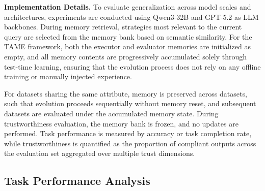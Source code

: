 \documentclass{article}
\theoremstyle{plain}
\theoremstyle{definition}
\theoremstyle{remark}
\begin{document}
\textbf{Implementation Details.}
To evaluate generalization across model scales and architectures, experiments are conducted using Qwen3-32B and GPT-5.2 as LLM backbones. During memory retrieval, strategies most relevant to the current query are selected from the memory bank based on semantic similarity. For the TAME framework, both the executor and evaluator memories are initialized as empty, and all memory contents are progressively accumulated solely through test-time learning, ensuring that the evolution process does not rely on any offline training or manually injected experience. 

For datasets sharing the same attribute, memory is preserved across datasets, such that evolution proceeds sequentially without memory reset, and subsequent datasets are evaluated under the accumulated memory state. During trustworthiness evaluation, the memory bank is frozen, and no updates are performed. Task performance is measured by accuracy or task completion rate, while trustworthiness is quantified as the proportion of compliant outputs across the evaluation set aggregated over multiple trust dimensions.


\subsection{Task Performance Analysis}
\label{sec:task_performance}



\end{document}
